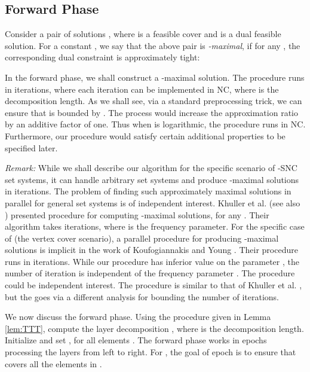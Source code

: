 \documentclass[11pt]{article}
\begin{document}
\subsection{Forward Phase}
Consider a pair of solutions ,
where  is a feasible cover and  is a dual feasible solution.
For a constant , we say that the above pair is {\em -maximal},
if for any , the corresponding dual constraint is approximately tight:

In the forward phase, we shall construct a -maximal solution.
The procedure runs in  iterations,
where each iteration can be implemented in NC, where  is the decomposition length.
As we shall see, via a standard preprocessing trick, we can ensure that  is 
bounded by . The process would increase the approximation ratio by an additive factor of one.
Thus when  is logarithmic, the procedure runs in NC.
Furthermore, our procedure would satisfy certain additional properties to be specified later. 

{\it Remark: }
While we shall describe our algorithm for the specific scenario of -SNC set systems,
it can handle arbitrary set systems and produce -maximal solutions
in  iterations.
The problem of finding such approximately maximal solutions in parallel for general set systems is of independent interest.
Khuller et al.\cite{KVY} (see also \cite{Gandhi}) presented procedure for computing -maximal solutions, 
for any .  Their algorithm takes  iterations, where  is the frequency parameter.
For the specific case of  (the vertex cover scenario),
a parallel procedure for producing -maximal solutions is implicit in the work of 
Koufogiannakis and Young \cite{Kouf-Young}.
Their procedure runs in  iterations.
While our procedure has inferior value on the parameter , the number of iteration is independent of the frequency parameter .
The procedure could be independent interest.
The procedure is similar to that of Khuller et al. \cite{KVY}, but the goes via a different analysis for bounding the number of iterations.

We now discuss the forward phase.
Using the procedure given in Lemma \ref{lem:TTT}, compute the layer decomposition , where  is the decomposition length.
Initialize  and set , for all elements .
The forward phase works in  epochs processing the layers from left to right.
For , the goal of epoch  is to ensure that 
 covers all the elements in .
\end{document}
